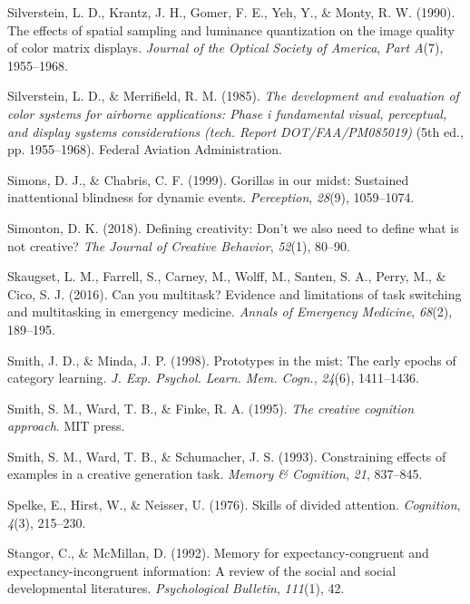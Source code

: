 \documentclass[
]{krantz}
\newlength{\cslhangindent}
\newenvironment{CSLReferences}[2] %
 {\begin{list}{}{%
  \setlength{\itemindent}{0pt}
  \setlength{\leftmargin}{0pt}
  \setlength{\parsep}{0pt}
  \ifodd #1
   \setlength{\leftmargin}{\cslhangindent}
   \setlength{\itemindent}{-1\cslhangindent}
  \fi
  \setlength{\itemsep}{#2\baselineskip}}}
 {\end{list}}
\begin{document}
\begin{CSLReferences}{1}{0}
Silverstein, L. D., Krantz, J. H., Gomer, F. E., Yeh, Y., \& Monty, R. W. (1990). The effects of spatial sampling and luminance quantization on the image quality of color matrix displays. \emph{Journal of the Optical Society of America}, \emph{Part A}(7), 1955--1968.

Silverstein, L. D., \& Merrifield, R. M. (1985). \emph{The development and evaluation of color systems for airborne applications: Phase i fundamental visual, perceptual, and display systems considerations (tech. Report DOT/FAA/PM085019)} (5th ed., pp. 1955--1968). Federal Aviation Administration.

Simons, D. J., \& Chabris, C. F. (1999). Gorillas in our midst: Sustained inattentional blindness for dynamic events. \emph{Perception}, \emph{28}(9), 1059--1074.

Simonton, D. K. (2018). Defining creativity: Don't we also need to define what is not creative? \emph{The Journal of Creative Behavior}, \emph{52}(1), 80--90.

Skaugset, L. M., Farrell, S., Carney, M., Wolff, M., Santen, S. A., Perry, M., \& Cico, S. J. (2016). Can you multitask? Evidence and limitations of task switching and multitasking in emergency medicine. \emph{Annals of Emergency Medicine}, \emph{68}(2), 189--195.

Smith, J. D., \& Minda, J. P. (1998). Prototypes in the mist: The early epochs of category learning. \emph{J. Exp. Psychol. Learn. Mem. Cogn.}, \emph{24}(6), 1411--1436.

Smith, S. M., Ward, T. B., \& Finke, R. A. (1995). \emph{The creative cognition approach}. MIT press.

Smith, S. M., Ward, T. B., \& Schumacher, J. S. (1993). Constraining effects of examples in a creative generation task. \emph{Memory \& Cognition}, \emph{21}, 837--845.

Spelke, E., Hirst, W., \& Neisser, U. (1976). Skills of divided attention. \emph{Cognition}, \emph{4}(3), 215--230.

Stangor, C., \& McMillan, D. (1992). Memory for expectancy-congruent and expectancy-incongruent information: A review of the social and social developmental literatures. \emph{Psychological Bulletin}, \emph{111}(1), 42.


\end{CSLReferences}
\end{document}
